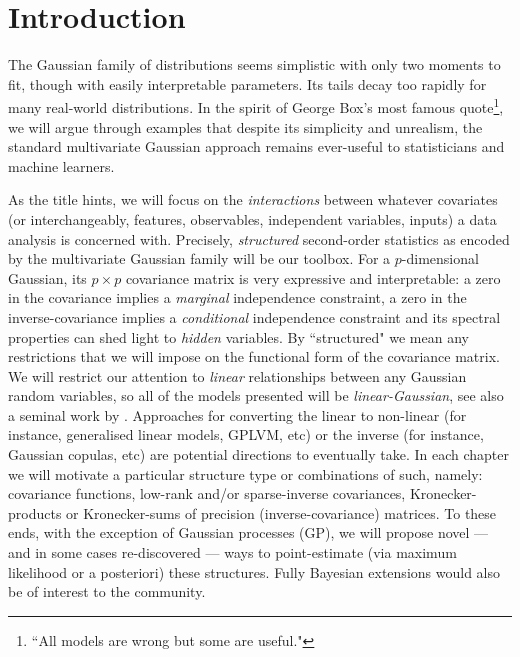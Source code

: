 \chapter{Introduction}
\ifpdf
    \graphicspath{{Introduction/IntroductionFigs/PNG/}{Introduction/IntroductionFigs/PDF/}{Introduction/IntroductionFigs/}}
\else
    \graphicspath{{Introduction/IntroductionFigs/EPS/}{Introduction/IntroductionFigs/}}
\fi


  {\color{black} The Gaussian family of distributions seems simplistic with only two moments to fit, though with easily interpretable parameters. Its tails decay too rapidly for many real-world distributions.}
  In the spirit of George Box's most famous quote\footnote{``All models are wrong but some are useful."}, we will argue through examples that despite its simplicity and unrealism, the standard multivariate Gaussian approach remains ever-useful to statisticians and machine learners.
  
  As the title hints, we will focus on the \emph{interactions} between whatever covariates (or interchangeably, features, observables, independent variables, inputs) a data analysis is concerned with.
  Precisely, \emph{structured} second-order statistics as encoded by the multivariate Gaussian family will be our toolbox.
  {\color{black} For a $p$-dimensional Gaussian, its $p \times p$ covariance matrix is very expressive and interpretable: a zero in the covariance implies a \emph{marginal} independence constraint, a zero in the inverse-covariance implies a \emph{conditional} independence constraint and its spectral properties can shed light to \emph{hidden} variables.}
  By ``structured" we mean any restrictions that we will impose on the functional form of the covariance matrix.
  We will restrict our attention to \emph{linear} relationships between any Gaussian random variables, so all of the models presented will be \emph{linear-Gaussian}, see also a seminal work by \citet{Roweis:unifying99}.
  {\color{black} Approaches for converting the linear to non-linear (for instance, generalised linear models, GPLVM, etc) or the inverse (for instance, Gaussian copulas, etc) are potential directions to eventually take.}
  In each chapter we will motivate a particular structure type or combinations of such, namely: covariance functions, low-rank and/or sparse-inverse covariances, Kronecker-products or Kronecker-sums of precision (inverse-covariance) matrices.
  To these ends, with the exception of Gaussian processes (GP), we will propose novel --- and in some cases re-discovered --- ways to point-estimate (via maximum likelihood or a posteriori) these structures. {\color{black} Fully Bayesian extensions would also be of interest to the community.}
  
